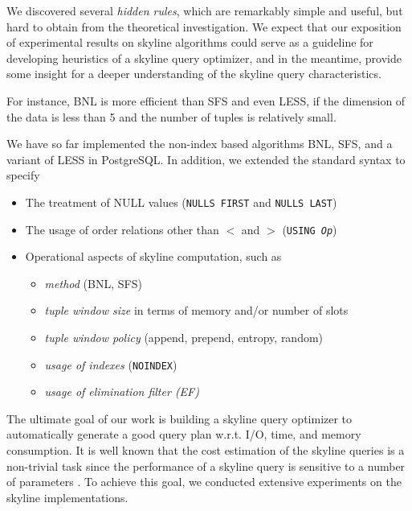We discovered several \emph{hidden rules}, which are remarkably simple
and useful, but hard to obtain from the theoretical investigation.  We
expect that our exposition of experimental results on skyline
algorithms could serve as a guideline for developing heuristics of a
skyline query optimizer, and in the meantime, provide some insight for
a deeper understanding of the skyline query characteristics.

For instance, BNL is more efficient than SFS and even LESS, if the
dimension of the data is less than 5 and the number of tuples is
relatively small.

We have so far implemented the non-index based algorithms
BNL, SFS, and a variant of LESS in PostgreSQL.
In addition, 
we extended the standard syntax to specify
\begin{itemize}
\item The treatment of NULL values (\texttt{NULLS FIRST} and \texttt{NULLS LAST})
\item The usage of order relations other than $<$ and $>$ (\texttt{USING \emph{Op}})
\item Operational aspects of skyline computation, such as 
\begin{itemize}
\item \emph{method} (BNL, SFS)
\item \emph{tuple window size} in terms of memory and/or number of slots
\item \emph{tuple window policy} (append, prepend, entropy, random)
\item \emph{usage of indexes} (\texttt{NOINDEX})
\item \emph{usage of elimination filter (EF)}
\end{itemize}
\end{itemize}

The ultimate goal of our work is building a skyline query optimizer to
automatically generate a good query plan w.r.t. I/O, time, and memory
consumption.  It is well known that the cost estimation of the skyline
queries is a non-trivial task \citep{Chaudhuri2006} since the
performance of a skyline query is sensitive to a number of parameters
\citep{Godfrey2007}.  To achieve this goal, we conducted extensive
experiments on the skyline implementations.

